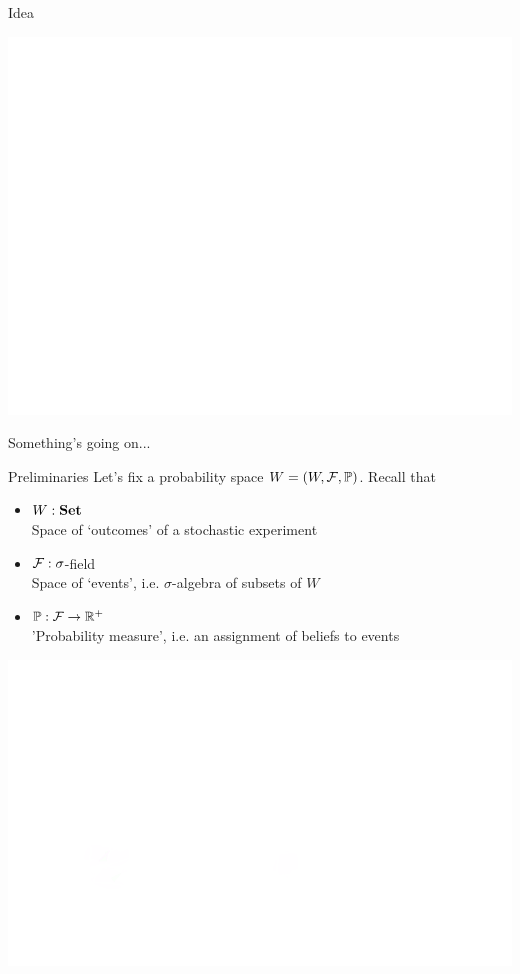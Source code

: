 \begin{frame}{Idea}
	\begin{center}
		\includegraphics[width=\columnwidth]{figures/intro.png}
	\end{center}
	Something's going on...
\end{frame}

\begin{frame}{Preliminaries}
	Let's fix a probability space $W = (W, \mathcal{F}, \mathbb{P})$.
	Recall that
	\begin{itemize}
		\item $W : \mathbf{Set}$\\
		Space of `outcomes' of a stochastic experiment
		\item $\mathcal{F} : \sigma$-field\\
		Space of `events', i.e. $\sigma$-algebra of subsets of $W$
		\item $\mathbb{P} : \mathcal{F} \to \mathbb{R}^+$\\
		'Probability measure', i.e. an assignment of beliefs to events
	\end{itemize}
	\begin{center}
		\includegraphics[width=.5\columnwidth]{figures/proba-space.png}
	\end{center}
\end{frame}

